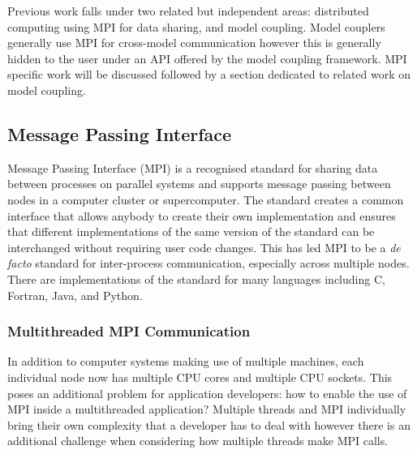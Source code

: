 \documentclass{acm_proc_article-sp}
\renewcommand{\_}{\underscore\hspace{0pt}}
\begin{document}
Previous work falls under two related but independent areas: distributed
computing using MPI for data sharing, and model coupling. Model couplers
generally use MPI for cross-model communication however this is generally hidden
to the user under an API offered by the model coupling framework. MPI specific
work will be discussed followed by a section dedicated to related work on model
coupling.

\subsection*{Message Passing Interface}

Message Passing Interface (MPI) is a recognised standard for sharing data
between processes on parallel systems and supports message passing between nodes
in a computer cluster or supercomputer. The standard creates a common interface
that allows anybody to create their own implementation and ensures that
different implementations of the same version of the standard can be
interchanged without requiring user code changes. This has led MPI to be a
\textit{de facto} standard for inter-process communication, especially across
multiple nodes. There are implementations of the standard for many languages
including C, Fortran, Java, and Python.

\subsubsection*{Multithreaded MPI Communication}

In addition to computer systems making use of multiple machines, each individual
node now has multiple CPU cores and multiple CPU sockets. This poses an
additional problem for application developers: how to enable the use of MPI
inside a multithreaded application? Multiple threads and MPI individually bring
their own complexity that a developer has to deal with however there is an
additional challenge when considering how multiple threads make MPI calls.
\end{document}
